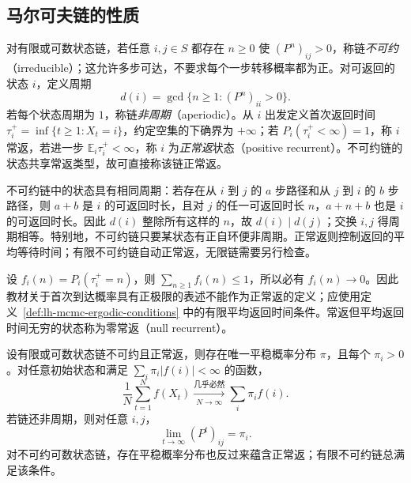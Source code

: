 \subsection{马尔可夫链的性质}
\label{subsec:lh-mcmc-markov-properties}

\begin{definition}
\label{def:lh-mcmc-ergodic-conditions}
对有限或可数状态链，若任意 $i,j\in S$ 都存在 $n\geq0$ 使 $(P^n)_{ij}>0$，称链\emph{不可约}（irreducible）；这允许多步可达，不要求每个一步转移概率都为正。对可返回的状态 $i$，定义周期
\[
d(i)=\gcd\{n\geq1:(P^n)_{ii}>0\}.
\]
若每个状态周期为 $1$，称链\emph{非周期}（aperiodic）。从 $i$ 出发定义首次返回时间 $\tau_i^+=\inf\{t\geq1:X_t=i\}$，约定空集的下确界为 $+\infty$；若 $P_i(\tau_i^+<\infty)=1$，称 $i$ 常返，若进一步 $\mathbb E_i\tau_i^+<\infty$，称 $i$ 为\emph{正常返}状态（positive recurrent）。不可约链的状态共享常返类型，故可直接称该链正常返。
\end{definition}

不可约链中的状态具有相同周期：若存在从 $i$ 到 $j$ 的 $a$ 步路径和从 $j$ 到 $i$ 的 $b$ 步路径，则 $a+b$ 是 $i$ 的可返回时长，且对 $j$ 的任一可返回时长 $n$，$a+n+b$ 也是 $i$ 的可返回时长。因此 $d(i)$ 整除所有这样的 $n$，故 $d(i)\mid d(j)$；交换 $i,j$ 得周期相等。特别地，不可约链只要某状态有正自环便非周期。正常返则控制返回的平均等待时间；有限不可约链自动正常返，无限链需要另行检查。

\begin{notealert}[type=caution,title={正常返不能用首次返回概率的正极限定义}]
设 $f_i(n)=P_i(\tau_i^+=n)$，则 $\sum_{n\geq1}f_i(n)\leq1$，所以必有 $f_i(n)\to0$。因此教材关于首次到达概率具有正极限的表述不能作为正常返的定义；应使用定义~\ref{def:lh-mcmc-ergodic-conditions} 中的有限平均返回时间条件。常返但平均返回时间无穷的状态称为零常返（null recurrent）。
\end{notealert}

\begin{theorem}[离散链的平稳分布与遍历结论]
\label{thm:lh-mcmc-ergodic}
设有限或可数状态链不可约且正常返，则存在唯一平稳概率分布 $\pi$，且每个 $\pi_i>0$。对任意初始状态和满足 $\sum_i\pi_i|f(i)|<\infty$ 的函数，
\begin{equation}
\frac1N\sum_{t=1}^N f(X_t)
\xrightarrow[N\to\infty]{\text{几乎必然}}
\sum_i\pi_i f(i).
\label{eq:lh-mcmc-ergodic-average}
\end{equation}
若链还非周期，则对任意 $i,j$，
\begin{equation}
\lim_{t\to\infty}(P^t)_{ij}=\pi_i.
\label{eq:lh-mcmc-marginal-limit}
\end{equation}
对不可约可数状态链，存在平稳概率分布也反过来蕴含正常返；有限不可约链总满足该条件。
\end{theorem}

